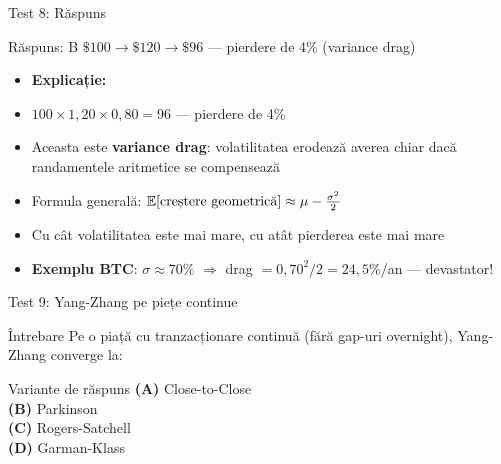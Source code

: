 \documentclass[9pt, aspectratio=169, t]{beamer}
\begin{document}
\begin{frame}[shrink=10]{Test 8: Răspuns}
\begin{cminipage}{0.95\textwidth}
    \begin{exampleblock}{Răspuns: B}
        $\$100 \to \$120 \to \$96$ --- pierdere de 4\% (variance drag)
    \end{exampleblock}
    \vspace{0.2cm}
    \begin{itemize}\setlength{\itemsep}{0pt}
        \item \textbf{Explicație:}
        \item $100 \times 1{,}20 \times 0{,}80 = 96$ --- pierdere de 4\%
        \item Aceasta este \textbf{variance drag}: volatilitatea erodează averea chiar dacă randamentele aritmetice se compensează
        \item Formula generală: $\mathbb{E}[\text{creștere geometrică}] \approx \mu - \frac{\sigma^2}{2}$
        \item Cu cât volatilitatea este mai mare, cu atât pierderea este mai mare
        \item \textbf{Exemplu BTC}: $\sigma \approx 70\%$ $\Rightarrow$ drag $= 0{,}70^2/2 = 24{,}5\%$/an --- devastator!
    \end{itemize}
\end{cminipage}
\end{frame}

\begin{frame}[shrink=10]{Test 9: Yang-Zhang pe piețe continue}
\begin{cminipage}{0.95\textwidth}
    \begin{alertblock}{Întrebare}
        Pe o piață cu tranzacționare continuă (fără gap-uri overnight), Yang-Zhang converge la:
    \end{alertblock}

    \vspace{0.5cm}
    \begin{block}{Variante de răspuns}
    \textcolor{MainBlue}{\textbf{(A)}} Close-to-Close\\[3pt]
    \textcolor{MainBlue}{\textbf{(B)}} Parkinson\\[3pt]
    \textcolor{MainBlue}{\textbf{(C)}} Rogers-Satchell\\[3pt]
    \textcolor{MainBlue}{\textbf{(D)}} Garman-Klass
    \end{block}
\end{cminipage}
\end{frame}
\end{document}
